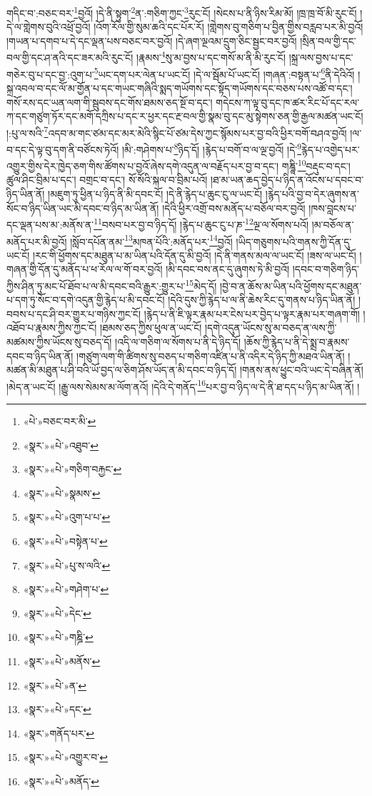 གདིང་བ་:བཅང་བར་\footnote{«པེ་»བཅང་བར་མི་}བྱའོ། །དེ་ནི་སྟུག་\footnote{«སྣར་»«པེ་»འཐུབ་}ན་:གཅིག་ཀྱང་\footnote{«སྣར་»«པེ་»གཅིག་བརྐྱང་}རུང་ངོ། །སེངས་པ་ནི་ཉིས་རིམ་མོ། །ཁྲ་ཁྲ་བོ་མི་རུང་ངོ། །དེ་ལ་གླེགས་བུའི་འཕྲོ་བྱའོ། །འོག་རོལ་གྱི་སུམ་ཆའི་དང་པོར་རོ། །གླེགས་བུ་གཅིག་པ་བྱིན་གྱིས་བརླབ་པར་མི་བྱའོ། །གཡན་པ་དགབ་པ་དེ་དང་ལྡན་པས་བཅང་བར་བྱའོ། །དེ་ཞག་ལྔའམ་དྲུག་ཅིང་སྦྱང་བར་བྱའོ། །སྲིན་བལ་གྱི་དང་བལ་གྱི་དང་ཤ་ནའི་དང་ཟར་མའི་རུང་ངོ། །རྣམས་\footnote{«སྣར་»«པེ་»སྣམས་}སུ་མ་བྱས་པ་དང་གསོ་མ་ནི་མི་རུང་ངོ། །སྐྲ་ལས་བྱས་པ་དང་གཅེར་བུ་པ་དང་བྱ་:འུག་པ་\footnote{«སྣར་»«པེ་»འུག་པ་པ་}ཡང་དག་པར་ལེན་པ་ཡང་ངོ། །དེ་ལ་སྦོམ་པོ་ཡང་ངོ། །གཞན་:བསྟན་པ་\footnote{«སྣར་»«པེ་»བསྟེན་པ་}ནི་དེའིའོ། །སྐྲ་འབལ་བ་དང་ལོ་མ་གྱོན་པ་དང་གཡང་གཞིའི་སྨད་གཡོགས་དང་སྟོད་གཡོགས་དང་བཅས་པས་འཚོ་བ་དང་། གསོ་རས་དང་ཡན་ལག་གི་སྦུབས་དང་གོས་ཐམས་ཅད་སྔོ་བ་དང་། གདེངས་ཀ་ལྟ་བུ་དང་ཁ་ཚར་རིང་པོ་དང་རལ་ཀ་དང་གཙུག་ཏོར་དང་མགོ་དཀྲིས་པ་དང་ར་ཕྱར་དང་རྔ་བལ་གྱི་སྣམ་བུ་དང་མུ་སྟེགས་ཅན་གྱི་རྒྱལ་མཚན་ཡང་ངོ། །:པུ་ལ་སའི་\footnote{«སྣར་»«པེ་»པུ་ས་ལའི་}འདབ་མ་གང་ཙམ་དང་མར་མེའི་སྙིང་པོ་ཙམ་དེས་ཀྱང་སྙོམས་པར་བྱ་བའི་ཕྱིར་བགོ་བཤའ་བྱའོ། །ལ་བ་དང་དེ་ལྟ་བུ་དག་ནི་བཙོངས་ཏེའོ། །མི་:གཤེགས་པ་\footnote{«སྣར་»«པེ་»གཤེག་པ་}ཉིད་དོ། །རྙེད་པ་བགོ་བ་ལ་ལྔ་བྱའོ། །དེ་\footnote{«སྣར་»«པེ་»དེང་}རྙེད་པ་འགྱེད་པར་འགྱུར་གྱིས་དེར་ཁྱེད་ཅག་གིས་ཚོགས་པ་བྱའོ་ཞེས་དགེ་འདུན་ལ་བརྗོད་པར་བྱ་བ་དང་། གཎྜཱི་\footnote{«སྣར་»«པེ་»གཎྜི་}བརྡུང་བ་དང་། ཚུལ་ཤིང་བྲིམ་པ་དང་། བགྲང་བ་དང་། སོ་སོའི་སྐལ་བ་བྲིམ་པའོ། །ཐ་མ་ཡན་ཆད་བྱེད་པ་ཉིད་ན་འོངས་པ་དབང་བ་ཉིད་ཡིན་ནོ། །མཇུག་ཏུ་ཕྱིན་པ་ཉིད་ནི་མི་དབང་ངོ། །དེ་ནི་རྙེད་པ་ཆུང་ངུ་ལ་ཡང་ངོ། །རྙེད་པའི་བྱ་བ་དེར་ཞུགས་ན་སོང་བ་ཉིད་ཡིན་ཡང་མི་དབང་བ་ཉིད་མ་ཡིན་ནོ། །དེའི་ཕྱིར་འགྲོ་བས་མནོད་པ་བཅོལ་བར་བྱའོ། །ཁས་བླངས་པ་དང་ལྡན་པས་མ་:མནོས་ན་\footnote{«སྣར་»«པེ་»མནོས་}བསབ་པར་བྱ་བ་ཉིད་དོ། །རྙེད་པ་ཆུང་ངུ་པ་ཎ་\footnote{«སྣར་»«པེ་»ན་}ལྔ་ལ་སོགས་པའོ། །མ་བཅོལ་ན་མནོད་པར་མི་བྱའོ། །སློབ་དཔོན་ནམ་\footnote{«སྣར་»«པེ་»དང་}མཁན་པོའི་:མནོད་པར་\footnote{«སྣར་»གནོད་པར་}བྱའོ། །ཡིད་གཅུགས་པའི་གནས་ཀྱི་དོན་དུ་ཡང་ངོ། །རང་གི་ཕྱོགས་དང་མཐུན་པ་མ་ཡིན་པའི་དོན་དུ་མི་བྱའོ། །དེ་ནི་གནས་མལ་ལ་ཡང་ངོ། །ཟས་ལ་ཡང་ངོ། །གཞན་གྱི་དོན་དུ་མནོད་པ་ཕ་རོལ་ལ་གོ་བར་བྱའོ། །མི་དབང་བས་ནང་དུ་ཞུགས་ཏེ་མི་བྱའོ། །དབང་བ་གཅིག་ཉིད་ཀྱིས་ཤིན་ཏུ་མང་པོ་ཐོབ་པ་ལ་མི་དབང་བའི་རྒྱུར་:གྱུར་པ་\footnote{«སྣར་»«པེ་»འགྱུར་བ་}མེད་དོ། །བྱེ་བ་ན་ཆོས་མ་ཡིན་པའི་ཕྱོགས་དང་མཐུན་པ་དག་ཏུ་སོང་བ་དགེ་འདུན་གྱི་རྙེད་པ་མི་དབང་ངོ། །དེའི་དུས་ཀྱི་རྙེད་པ་ལ་ནི་ཆེས་རིང་དུ་གནས་པ་ཉིད་ཡིན་ནོ། །བབས་པ་དང་ཤི་བར་གྱུར་པ་གཉིས་ཀྱང་ངོ། །རྙེད་པ་ནི་ཇི་ལྟར་རྣམ་པར་ངེས་པར་བྱེད་པ་ལྟར་རྣམ་པར་གཞག་གོ། །འཐོབ་པ་རྣམས་ཀྱིས་ཀྱང་ངོ། །ཐམས་ཅད་ཀྱིས་ཕུལ་ན་ཡང་ངོ། །དགེ་འདུན་ཡོངས་སུ་མ་བཅད་ན་ལས་ཀྱི་མཚམས་ཀྱིས་ཡོངས་སུ་བཅད་དོ། །འདི་ལ་གཅིག་ལ་སོགས་པ་ནི་དེ་ཉིད་དོ། །ཆོས་ཀྱི་རྙེད་པ་ནི་དེ་སྨྲ་བ་རྣམས་དབང་བ་ཉིད་ཡིན་ནོ། །གཙུག་ལག་གི་ཚིགས་སུ་བཅད་པ་གཅིག་འཛིན་པ་ནི་འདིར་དེ་ཉིད་ཀྱི་མཐའ་ཡིན་ནོ། །མཚན་མི་མཐུན་པ་ཤི་བའི་ཡོ་བྱད་ལ་ཅིག་ཤོས་ཡོད་ན་མི་དབང་བ་ཉིད་དོ། །གནས་ནས་ཕྱུང་བའི་ཡང་དེ་བཞིན་ནོ། །མེད་ན་ཡང་ངོ། །རྒྱུ་ལས་སེམས་མ་ལོག་ནའོ། །དེའི་དེ་གནོད་\footnote{«སྣར་»«པེ་»མནོད་}པར་བྱ་བ་ཉིད་ལ་དེ་ནི་ཐ་དད་པ་ཉིད་མ་ཡིན་ནོ། །
